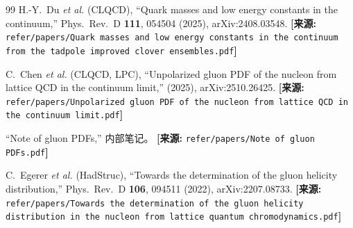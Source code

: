 \documentclass[12pt,a4paper]{ctexart}
\theoremstyle{definition}
\begin{document}
\begin{thebibliography}{99}
H.-Y.~Du \textit{et al.} (CLQCD),
``Quark masses and low energy constants in the continuum,''
Phys.\ Rev.\ D \textbf{111}, 054504 (2025), arXiv:2408.03548.
\quad\textbf{[来源:} \texttt{refer/papers/Quark masses and low energy constants in the continuum from the tadpole improved clover ensembles.pdf}\textbf{]}

C.~Chen \textit{et al.} (CLQCD, LPC),
``Unpolarized gluon PDF of the nucleon from lattice QCD in the continuum limit,''
(2025), arXiv:2510.26425.
\quad\textbf{[来源:} \texttt{refer/papers/Unpolarized gluon PDF of the nucleon from lattice QCD in the continuum limit.pdf}\textbf{]}

``Note of gluon PDFs,'' 内部笔记。
\quad\textbf{[来源:} \texttt{refer/papers/Note of gluon PDFs.pdf}\textbf{]}

C.~Egerer \textit{et al.} (HadStruc),
``Towards the determination of the gluon helicity distribution,''
Phys.\ Rev.\ D \textbf{106}, 094511 (2022), arXiv:2207.08733.
\quad\textbf{[来源:} \texttt{refer/papers/Towards the determination of the gluon helicity distribution in the nucleon from lattice quantum chromodynamics.pdf}\textbf{]}

\end{thebibliography}
\end{document}
